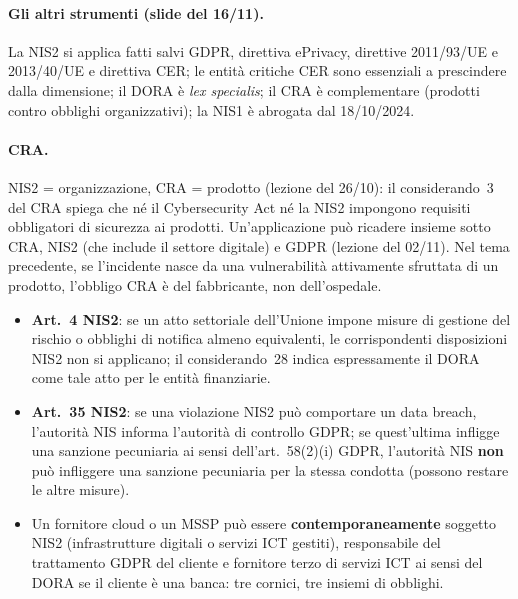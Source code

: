 \paragraph{Gli altri strumenti (slide del 16/11).} La NIS2 si applica fatti salvi GDPR, direttiva
ePrivacy, direttive 2011/93/UE e 2013/40/UE e direttiva CER; le entità critiche CER sono essenziali a
prescindere dalla dimensione; il DORA è \emph{lex specialis}; il CRA è complementare (prodotti contro
obblighi organizzativi); la NIS1 è abrogata dal 18/10/2024.

\paragraph{CRA.} NIS2 = organizzazione, CRA = prodotto (lezione del 26/10): il considerando~3 del CRA
spiega che né il Cybersecurity Act né la NIS2 impongono requisiti obbligatori di sicurezza ai prodotti.
Un'applicazione può ricadere insieme sotto CRA, NIS2 (che include il settore digitale) e GDPR (lezione
del 02/11). Nel tema precedente, se l'incidente nasce da una vulnerabilità attivamente sfruttata di un
prodotto, l'obbligo CRA è del fabbricante, non dell'ospedale.

\begin{integrazione}
\begin{itemize}
  \item \textbf{Art.~4 NIS2}: se un atto settoriale dell'Unione impone misure di gestione del rischio o
    obblighi di notifica almeno equivalenti, le corrispondenti disposizioni NIS2 non si applicano; il
    considerando~28 indica espressamente il DORA come tale atto per le entità finanziarie.
  \item \textbf{Art.~35 NIS2}: se una violazione NIS2 può comportare un data breach, l'autorità NIS
    informa l'autorità di controllo GDPR; se quest'ultima infligge una sanzione pecuniaria ai sensi
    dell'art.~58(2)(i) GDPR, l'autorità NIS \textbf{non} può infliggere una sanzione pecuniaria per la
    stessa condotta (possono restare le altre misure).
  \item Un fornitore cloud o un MSSP può essere \textbf{contemporaneamente} soggetto NIS2 (infrastrutture
    digitali o servizi ICT gestiti), responsabile del trattamento GDPR del cliente e fornitore terzo
    di servizi ICT ai sensi del DORA se il cliente è una banca: tre cornici, tre insiemi di obblighi.
\end{itemize}
\end{integrazione}

